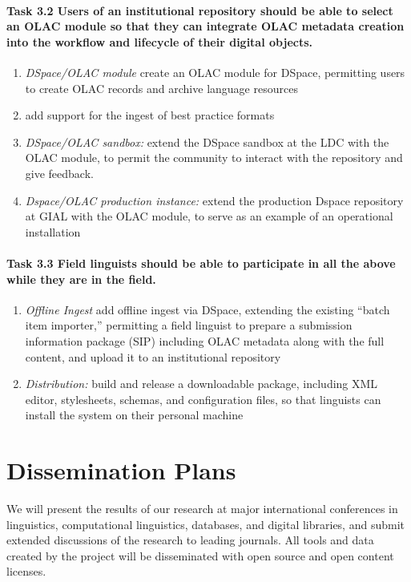 \def\task{3.2}
\paragraph{Task {\task} Users of an institutional repository should be
    able to select an OLAC module so that they can integrate OLAC
    metadata creation into the workflow and lifecycle of their
    digital objects.}

\begin{enumerate}[label=\emph{\task\alph*}]
\item \emph{DSpace/OLAC module}
  create an OLAC module for DSpace, permitting users to create OLAC
  records and archive language resources
\item add support for the ingest of best practice formats
\item \emph{DSpace/OLAC sandbox:}
  extend the DSpace sandbox at the LDC with the OLAC module,
  to permit the community to interact with the repository and give feedback.
\item \emph{Dspace/OLAC production instance:}
  extend the production Dspace repository at GIAL with the OLAC
  module, to serve as an example of an operational installation 
\end{enumerate}

\def\task{3.3}
\paragraph{Task {\task} Field linguists should be able to participate in all the
    above while they are in the field.}

\begin{enumerate}[label=\emph{\task\alph*}]
\item \emph{Offline Ingest}
  add offline ingest via DSpace, extending the existing ``batch
  item importer,'' permitting a field linguist to
  prepare a submission information package (SIP) including OLAC
  metadata along with the full content, and upload it to an institutional repository
\item \emph{Distribution:}
  build and release a downloadable package, including XML editor,
  stylesheets, schemas, and configuration files, so that linguists
  can install the system on their personal machine
\end{enumerate}

\section{Dissemination Plans}
\label{sec:dissemination}

We will present the results of our research at major international
conferences in linguistics, computational linguistics, databases, and
digital libraries, and submit extended discussions of the research to
leading journals.  All tools and data created by the project will be
disseminated with open source and open content licenses.


